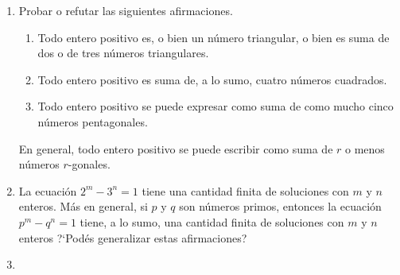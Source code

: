 \begin{enumerate}[label=P\arabic*]
\begin{displaymath}
\begin{tikzpicture}
				\filldraw
				(0,0) --
				++(.5,0) circle (2pt) --
				++(72:.5) circle (2pt) --
				++(2*72:.5) circle (2pt) --
				++(3*72:.5) circle (2pt) --
				++(4*72:.5) ;
				\filldraw
				(0,0) --
				++(2*.5,0) circle (2pt) --
				++(72:.5) circle (2pt) --
				++(72:.5) circle (2pt) --
				++(2*72:.5) circle (2pt) --
				++(2*72:.5) circle (2pt) --
				++(3*72:.5) circle (2pt) --
				++(3*72:.5) circle (2pt) --
				++(4*72:.5) --
				++(4*72:.5) ;
				\filldraw
				(0,0)  --
				++(3*.5,0) circle (2pt) --
				++(72:.5) circle (2pt) --
				++(72:.5) circle (2pt) --
				++(72:.5) circle (2pt) --
				++(2*72:.5) circle (2pt) --
				++(2*72:.5) circle (2pt) --
				++(2*72:.5) circle (2pt) --
				++(3*72:.5) circle (2pt) --
				++(3*72:.5) circle (2pt) --
				++(3*72:.5) circle (2pt) --
				++(4*72:.5) --
				++(4*72:.5) --
				++(4*72:.5) ;
			\end{tikzpicture}
		\end{displaymath}
		?`Cu\'ales son los primeros n\'umeros hexagonales?
		?`Cu\'ales son los primeros n\'umeros heptagonales?
		?`Cu\'ales son los primeros n\'umeros ``$r$-gonales''?
		Dar f\'ormulas para el $n$-\'esimo n\'umero
		triangular, para el $n$-\'esimo n\'umero cuadrado,
		para el $n$-\'esimo n\'umero pentagonal y, en general,
		para el $n$-\'esimo n\'umero $r$-gonal.
	\item\label{item:triangulares:sumas}
		Probar o refutar las siguientes afirmaciones.
		\begin{enumerate}[label=(\alph*)]
			\item
				Todo entero positivo es, o bien un
				n\'umero triangular, o bien es suma
				de dos o de tres n\'umeros triangulares.
			\item
				Todo entero positivo es suma de, a lo sumo,
				cuatro n\'umeros cuadrados.
			\item
				Todo entero positivo se puede expresar
				como suma de como mucho cinco n\'umeros
				pentagonales.
		\end{enumerate}
		En general, todo entero positivo se puede escribir
		como suma de $r$ o menos n\'umeros $r$-gonales.
	\item\label{item:catalan}
		La ecuaci\'on $2^m-3^n=1$ tiene una cantidad finita
		de soluciones con $m$ y $n$ enteros. M\'as en general,
		si $p$ y $q$ son n\'umeros primos, entonces la
		ecuaci\'on $p^m-q^n=1$ tiene, a lo sumo, una cantidad
		finita de soluciones con $m$ y $n$ enteros
		?`Pod\'es generalizar estas afirmaciones?
	\item\label{item:ciclotomicos}

\end{enumerate}
